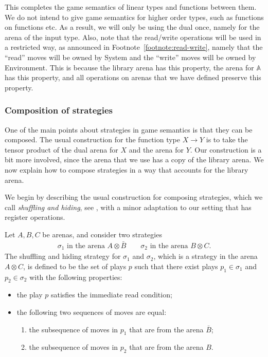 \documentclass[10pt,a4paper]{amsart}
\numberwithin{equation}{section}
\theoremstyle{plain}
\newcommand{\atoms}{\mathbb A}
\begin{document}
This completes the game semantics of linear types and functions between them. We do not intend to give game semantics for higher order types, such as functions on functions etc. As a result, we will only be using the dual once, namely for the arena of the input type. Also, note that the read/write operations will be used in a restricted way, as announced in Footnote~\ref{footnote:read-write}, namely that the ``read'' moves will be owned by System and the ``write'' moves will be owned by Environment.  This is because the library arena has this property, the arena for $\atoms$ has this property, and all operations on arenas that we have defined preserve this property.

\subsubsection{Composition of strategies}
\label{sec:composition-of-strategies}
One of the main points about strategies in game semantics is that they can be composed.
The usual construction for the function type $X \to Y$ is to take the tensor product of the dual arena for $X$ and the arena for $Y$. 
Our construction is a bit more involved, since the arena that we use has a copy of the library arena. We now explain how to compose strategies in a way that accounts for the library arena. 

We begin by describing the usual construction for composing strategies, which we call \emph{shuffling and hiding}, see \cite[p.12]{abramsky2013semantics}, with a minor adaptation to our setting that has register operations. 

\begin{definition}\label{def:shuffling-and-hiding}
    Let $A, B, C$ be arenas, and consider two strategies
    \begin{align*}
    \sigma_1 \text{ in the arena $A \otimes \bar B$}
    \qquad
    \sigma_2 \text{ in the arena $B \otimes C$}.
    \end{align*}
    The shuffling and hiding strategy for  $\sigma_1$ and $\sigma_2$, which is a strategy  in the  arena $A \otimes C$, is defined to be the set of plays    $p$  such that there exist plays $p_1 \in \sigma_1$ and  $p_2 \in \sigma_2$  with the following properties: 
\begin{itemize}
    \item the play $p$ satisfies the immediate read condition;
    \item the following two sequences of moves are equal: 
    \begin{enumerate}
        \item the subsequence of moves in $p_1$ that are from the arena $\bar B$;
        \item the subsequence of moves in $p_2$ that are from the arena $B$.
    \end{enumerate}
\end{itemize}
\end{definition}
\end{document}
